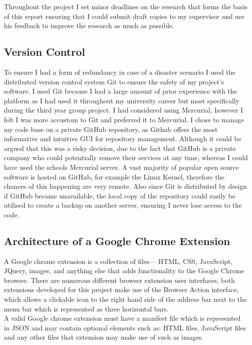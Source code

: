 \documentclass[12pt]{article}
\begin{document}
Throughout the project I set minor deadlines on the research that forms the basis of this report ensuring that I could submit draft copies to my supervisor and use his feedback to improve the research as much as possible. 

\subsection{Version Control}
To ensure I had a form of redundancy in case of a disaster scenario I used the distributed version control system Git to ensure the safety of my project's software. I used Git because I had a large amount of prior experience with the platform as I had used it throughout my university career but most specifically during the third year group project. I had considered using Mercurial, however I felt I was more accustom to Git and preferred it to Mercurial. I chose to manage my code base on a private GitHub repository, as Github offers the most informative and intuitive GUI for repository management. Although it could be argued that this was a risky decision, due to the fact that GitHub is a private company who could potentially remove their services at any time, whereas I could have used the schools Mercurial server. A vast majority of popular open source software is hosted on GitHub, for example the Linux Kernel, therefore the chances of this happening are very remote.  Also since Git is distributed by design if GitHub became unavailable, the local copy of the repository could easily be utilised to create a backup on another server, ensuring I never lose access to the code.

\subsection{Architecture of a Google Chrome Extension}
A Google chrome extension is a collection of files— HTML, CSS, JavaScript, JQuery, images, and anything else that adds functionality to the Google Chrome browser. There are numerous different browser extension user interfaces, both extensions developed for this project make use of the Browser Action interface, which allows a clickable icon to the right hand side of the address bar next to the menu bar which is represented as three horizontal bars. \\

A valid Google chrome extension must have a manifest file which is represented in JSON and may contain optional elements such as: HTML files, JavaScript files and any other files that extension may make use of such as images. \\
\end{document}
